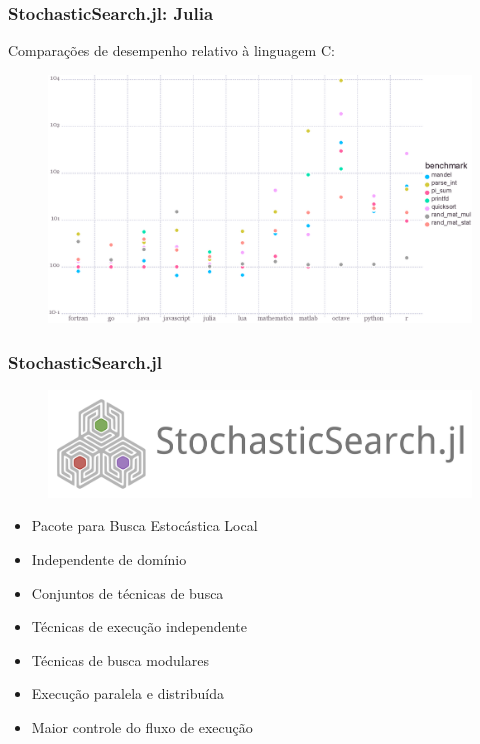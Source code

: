 \documentclass[10pt, compress]{beamer}
\begin{document}
\begin{frame}[fragile]
    \frametitle{StochasticSearch.jl: Julia}
    Comparações de desempenho relativo à linguagem \alert{C}:
    \begin{figure}[H]
        \centering
        \includegraphics[width=1\textwidth]{juliabenchmarks}
    \end{figure}%
    \let\thefootnote\relax{}
\end{frame}

\begin{frame}[fragile]
    \frametitle{StochasticSearch.jl}
    \begin{figure}[H]
        \centering
        \includegraphics[width=.7\textwidth]{stochasticsearchlogo}
    \end{figure}%
    \begin{itemize}
        \item Pacote para \alert{Busca Estocástica Local}
        \item \alert{Independente} de domínio
        \item \alert{Conjuntos} de técnicas de busca
        \item Técnicas de execução \alert{independente}
        \item Técnicas de busca \alert{modulares}
        \item Execução \alert{paralela} e \alert{distribuída}
        \item Maior \alert{controle} do fluxo de execução
    \end{itemize}
\end{frame}
\end{document}
